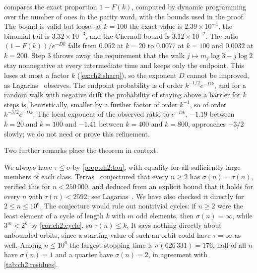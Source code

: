  compares the exact proportion $1-F(k)$, computed by
dynamic programming over the number of ones in the parity word, with the
bounds used in the proof. The bound is valid but loose: at $k=100$ the exact
value is $2.39\times10^{-4}$, the binomial tail is $3.32\times10^{-3}$, and the
Chernoff bound is $3.12\times10^{-2}$. The ratio $(1-F(k))/e^{-Dk}$ falls
from $0.052$ at $k=20$ to $0.0077$ at $k=100$ and $0.0032$ at $k=200$. Step 3
throws away the requirement that the walk $j\mapsto m_j\log3-j\log2$ stay
nonnegative at every intermediate time and keeps only the endpoint.
This loses at most a factor $k$ (\cref{ex:ch2:sharp}), so the exponent $D$ cannot be improved, as Lagarias~\cite{lagarias1985} observes.
The endpoint probability is of order $k^{-1/2}e^{-Dk}$, and for a random walk with negative drift the probability of staying above a barrier for $k$ steps is, heuristically, smaller by a further factor of order $k^{-1}$, so of order $k^{-3/2}e^{-Dk}$.
The local exponent of the observed ratio to $e^{-Dk}$, $-1.19$ between $k=20$ and $k=100$ and $-1.41$ between $k=400$ and $k=800$, approaches $-3/2$ slowly; we do not need or prove this refinement.

Two further remarks place the theorem in context.

\begin{remark}\label{rem:ch2:cst}
We always have $\tau\leq\sigma$ by \cref{prop:ch2:tau}, with equality
for all sufficiently large members of each class.
Terras~\cite{terras1976} conjectured that every $n\geq2$ has $\sigma(n)=\tau(n)$, verified this for $n<250\,000$, and deduced from an explicit bound that it holds for every $n$ with $\tau(n)<2592$; see Lagarias~\cite[Theorem~H]{lagarias1985}.
We have also checked it directly for $2\leq n\leq10^6$.
The
conjecture would rule out nontrivial cycles: if $n\geq2$ were the least
element of a cycle of length $k$ with $m$ odd elements, then $\sigma(n)=\infty$,
while $3^m<2^k$ by \cref{cor:ch2:cycle}, so $\tau(n)\leq k$. It says nothing
directly about unbounded orbits, since a starting value of such an orbit
could have $\tau=\infty$ as well. Among
$n\leq10^6$ the largest stopping time is $\sigma(626\,331)=176$; half of all
$n$ have $\sigma(n)=1$ and a quarter have $\sigma(n)=2$, in agreement with
\cref{tab:ch2:residues}.
\end{remark}

